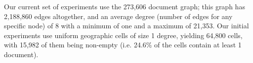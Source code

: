 \par %
Our current set of experiments use the 273,606
document graph; this graph has  2,188,860 edges altogether, and an average
degree (number of edges for any  specific node) of 8 with a minimum of one and
a maximum of 21,353. Our initial  experiments use uniform geographic cells of
size 1 degree, yielding 64,800  cells, with 15,982 of them being non-empty
(i.e. 24.6\% of the cells contain at  least 1 document).


